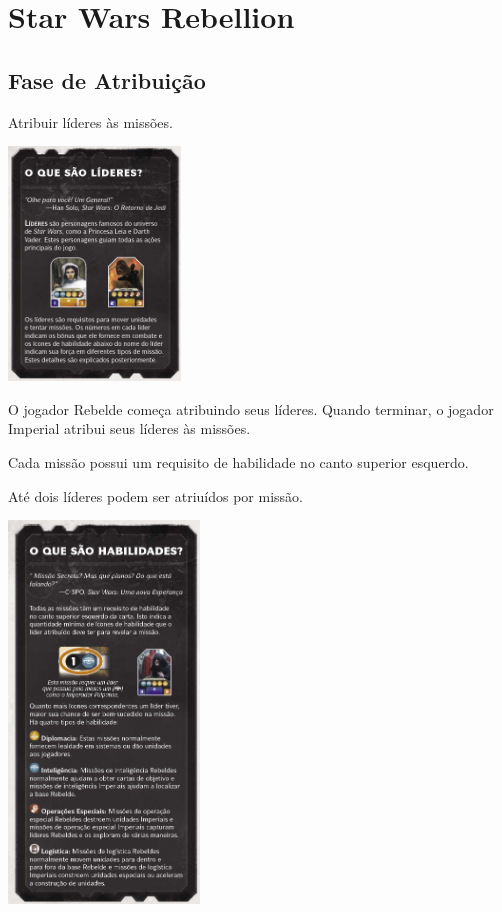 \documentclass[11pt]{article}
\author{Fabio Favero Henkes}
\date{\today}
\title{}
\begin{document}
\tableofcontents


\section{Star Wars Rebellion}
\label{sec:org00c70a9}

\subsection{Fase de Atribuição}
\label{sec:org5c2ad61}

Atribuir líderes às missões.

\begin{center}
\includegraphics[width=1.8in]{./lider.png}
\end{center}

O jogador Rebelde começa atribuindo seus líderes. Quando terminar, o jogador Imperial atribui seus líderes às missões.

Cada missão possui um requisito de habilidade no canto superior esquerdo.

Até dois líderes podem ser atriuídos por missão.

\begin{center}
\includegraphics[width=2.0in]{./skills.png}
\end{center}
\end{document}
